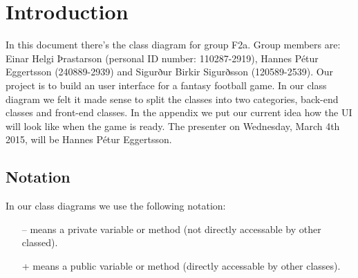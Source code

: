 \documentclass{article}
\begin{document}
\section{Introduction}
In this document there's the class diagram for group F2a. Group members are: Einar Helgi Þrastarson (personal ID number: 110287-2919), Hannes Pétur Eggertsson (240889-2939) and Sigurður Birkir Sigurðsson (120589-2539). Our project is to build an user interface for a fantasy football game. In our class diagram we felt it made sense to split the classes into two categories, back-end classes and front-end classes. In the appendix we put our current idea how the UI will look like when the game is ready. The presenter on Wednesday, March 4th 2015, will be Hannes Pétur Eggertsson.

\subsection{Notation}
In our class diagrams we use the following notation:\vspace*{-0.3cm}
\begin{itemize}\itemsep-4pt
\item[--] means a private variable or method (not directly accessable by other classed).
\item[+] means a public variable or method (directly accessable by other classes).
\end{itemize}

\end{document}
